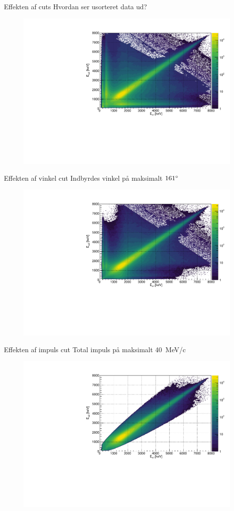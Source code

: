 \begin{frame}{Effekten af cuts}
	Hvordan ser usorteret data ud?\\
	\begin{figure}
		\includegraphics[width=0.7\columnwidth]{../figures/EENoCuts.pdf}
	\end{figure}
\end{frame}

\begin{frame}{Effekten af vinkel cut}
	Indbyrdes vinkel på maksimalt $161\degree$\\
	\begin{figure}
		\includegraphics[width=0.7\columnwidth]{../figures/EEAngleCut.pdf}
	\end{figure}
\end{frame}

\begin{frame}{Effekten af impuls cut}
	Total impuls på maksimalt \SI{40}{MeV/c}
	\begin{figure}
		\includegraphics[width=.7\columnwidth]{../figures/EEMomentumCut.pdf}
	\end{figure}
\end{frame}

